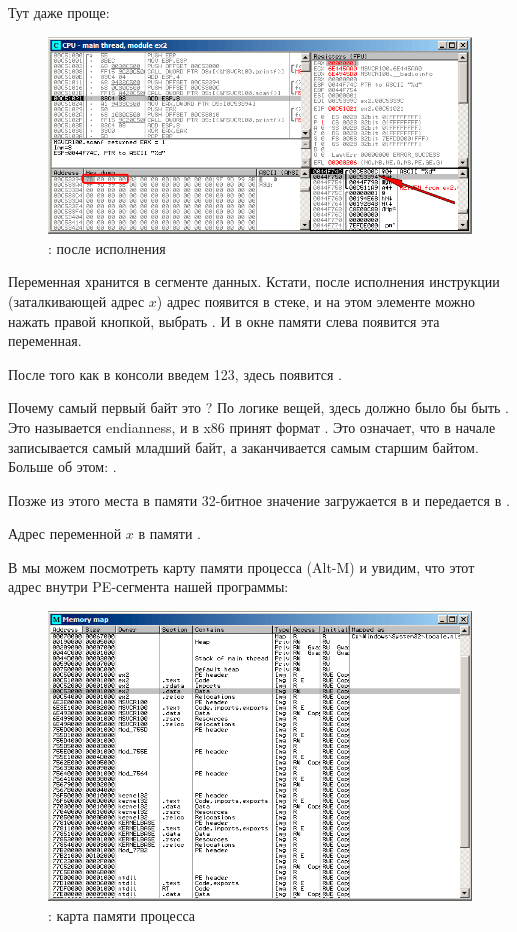 \clearpage
{}
\myindex{\olly}

Тут даже проще:

\begin{figure}[H]
\centering
\includegraphics[scale=\FigScale]{patterns/04_scanf/2_global/ex2_olly_1.png}
\caption{\olly: после исполнения \scanf}
\label{fig:scanf_ex2_olly_1}
\end{figure}

Переменная хранится в сегменте данных.
Кстати, после исполнения инструкции \PUSH (заталкивающей адрес $x$) адрес появится в стеке, 
и на этом элементе можно нажать правой кнопкой, выбрать .
И в окне памяти слева появится эта переменная.

После того как в консоли введем 123, здесь появится .

Почему самый первый байт это ?
По логике вещей, здесь должно было бы быть .
Это называется \gls{endianness}, и в x86 принят формат .
Это означает, что в начале записывается самый младший байт, а заканчивается самым старшим байтом.
Больше об этом: .

Позже из этого места в памяти 32-битное значение загружается в \EAX и передается в \printf.

Адрес переменной $x$ в памяти .

\clearpage
В \olly{} мы можем посмотреть карту памяти процесса (Alt-M) и увидим, что этот адрес
внутри PE-сегмента  нашей программы:

\begin{figure}[H]
\centering
\includegraphics[scale=\FigScale]{patterns/04_scanf/2_global/ex2_olly_2.png}
\caption{\olly: карта памяти процесса}
\label{fig:scanf_ex2_olly_2}
\end{figure}
